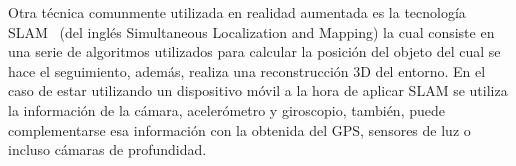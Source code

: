 Otra técnica comunmente utilizada en realidad aumentada es la tecnología SLAM~\cite{arSLAM} (del inglés Simultaneous Localization and Mapping) la cual consiste en una serie de algoritmos utilizados para calcular la posición del objeto del cual se hace el seguimiento, además, realiza una reconstrucción 3D del entorno. En el caso de estar utilizando un dispositivo móvil a la hora de aplicar SLAM se utiliza la información de la cámara, acelerómetro y giroscopio, también, puede complementarse esa información con la obtenida del GPS, sensores de luz o incluso cámaras de profundidad.